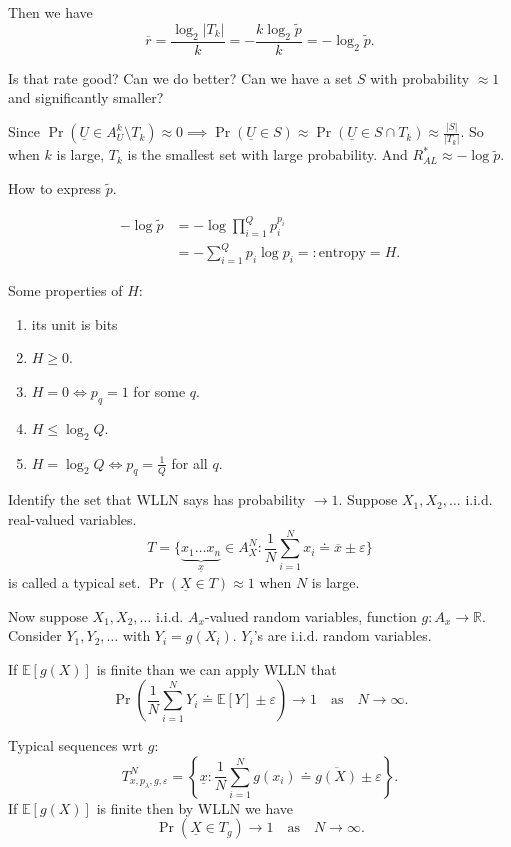 \documentclass{report}
\newcommand{\R}{\mathbb{R}}
\newcommand{\matE}{\mathbb{E}}
\newcommand{\eqdef}{=\mathrel{\mathop:}}
\theoremstyle{definition}
\theoremstyle{remark}
\numberwithin{equation}{section}
\begin{document}
Then we have \[
  \overline{r} = \frac{\log_2|T_k|}{k} = -\frac{k\log_2\tilde{p}}{k} = -\log_2\tilde{p}. 
\]

Is that rate good? Can we do better? Can we have a set $S$ with probability $\approx 1$ and significantly smaller?

Since $\Pr(\underline{U} \in A^k_U \setminus T_k) \approx 0 \implies \Pr(\underline{U} \in S) \approx \Pr(\underline{U} \in S \cap T_k) \approx \frac{|S|}{|T_k|}$. So when $k$ is large, $T_k$ is the smallest set with large probability. And $R^*_{AL} \approx -\log \tilde{p}$.

How to express $\tilde{p}$.

\begin{align*}
  -\log \tilde{p} & = -\log \prod_{i=1}^Q p_i^{p_i} \\
  & = -\sum_{i=1}^Q p_i\log p_i \eqdef \text{entropy} = H.
\end{align*}

Some properties of $H$:
\begin{enumerate}
  \item its unit is bits
  \item $H \geq 0$.
  \item $H = 0 \iff p_q = 1$ for some $q$.
  \item $H \leq \log_2 Q$.
  \item $H = \log_2 Q \iff p_q = \frac{1}{Q}$ for all $q$.
\end{enumerate}


Identify the set that WLLN says has probability $\to 1$. Suppose $X_1, X_2, \ldots$ i.i.d. real-valued variables. \[
  T = \{\underbrace{x_1 \ldots x_n}_{\underline{x}} \in A_X^N: \frac{1}{N}\sum_{i=1}^N x_i \doteq \overline{x} \pm \varepsilon\}  
\] is called a typical set. $\Pr(\underline{X} \in T) \approx 1$ when $N$ is large.

Now suppose $X_1, X_2, \ldots$ i.i.d. $A_x$-valued random variables, function $g: A_x \to \R$. Consider $Y_1, Y_2, \ldots$ with $Y_i = g(X_i)$. $Y_i$'s are i.i.d. random variables. 

If $\matE[g(X)]$ is finite than we can apply WLLN that \[
  \Pr\left(\frac{1}{N}\sum_{i=1}^{N} Y_i \doteq \matE[Y] \pm \varepsilon\right) \to 1 \quad \text{as} \quad N \to \infty.
\]

Typical sequences wrt $g$: \[
  T^N_{x, p_\lambda, g, \varepsilon} = \left\lbrace\underline{x}: \frac{1}{N}\sum_{i=1}^N g(x_i) \doteq \overline{g(X)} \pm \varepsilon\right\rbrace. 
\]
If $\matE[g(X)]$ is finite then by WLLN we have \[
  \Pr(\underline{X} \in T_g) \to 1 \quad \text{as} \quad N \to \infty.  
\]
\end{document}
